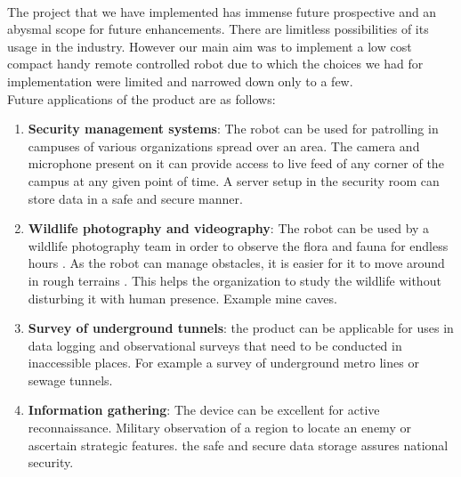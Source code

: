 \paragraph{}The project that we have implemented has immense future prospective and an abysmal scope for future enhancements. There are limitless possibilities of its usage in the industry. However our main aim was to implement a low cost compact handy remote controlled robot due to which the choices we had for implementation were limited and narrowed down only to a few.\\
\newline
Future applications of the product are as follows:
\begin{enumerate}
\item \textbf{Security management systems}: The robot can be used for patrolling in campuses of various organizations spread over an area. The camera and microphone present on it can provide access to live feed of any corner of the campus at any given point of time. A server setup in the security room can store data in a safe and secure manner.

\item \textbf{Wildlife photography and videography}: The robot can be used by a wildlife photography team in order to observe the flora and fauna for endless hours . As the robot can manage obstacles, it is easier for it to move around in rough terrains . This helps the organization to study the wildlife without disturbing it with human presence. Example mine caves.

\item \textbf{Survey of underground tunnels}: the product can be applicable for uses in data logging and observational surveys that need to be conducted in inaccessible places. For example a survey of underground metro lines or sewage tunnels.

\item \textbf{Information gathering}: The device can be excellent for active reconnaissance. Military observation of a region to locate an enemy or ascertain strategic features. the safe and secure data storage assures national security.
\end{enumerate}